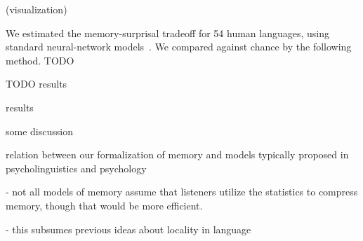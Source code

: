 \documentclass[11pt,letterpaper]{article}
\begin{document}
(visualization)

We estimated the memory-surprisal tradeoff for 54 human languages, using standard neural-network models~\citep{hochreiter-long-1997}.
We compared against chance by the following method.
TODO

TODO results

results

some discussion

relation between our formalization of memory and models typically proposed in psycholinguistics and psychology

- not all models of memory assume that listeners utilize the statistics to compress memory, though that would be more efficient.

- this subsumes previous ideas about locality in language










\end{document}
